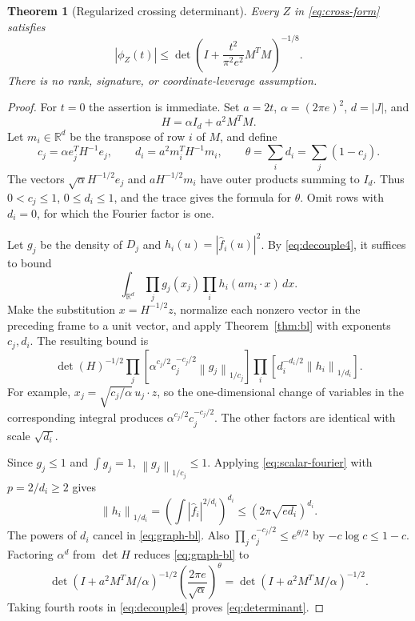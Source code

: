 \documentclass[11pt]{article}
\numberwithin{equation}{section}
\newtheorem{theorem}{Theorem}[section]
\theoremstyle{definition}\newtheorem{definition}[theorem]{Definition}
\theoremstyle{remark}\newtheorem{remark}[theorem]{Remark}
\newcommand{\R}{\mathbb R}\newcommand{\E}{\mathbb E}\newcommand{\PP}{\mathbb P}
\newcommand{\1}{\mathbf 1}\newcommand{\diag}{\operatorname{diag}}
\newcommand{\norm}[1]{\left\lVert#1\right\rVert}\newcommand{\abs}[1]{\left|#1\right|}
\begin{document}
\begin{theorem}[Regularized crossing determinant]\label{thm:determinant}
Every $Z$ in \eqref{eq:cross-form} satisfies
\begin{equation}\label{eq:determinant}
 |\phi_Z(t)|\le\det\left(I+\frac{t^2}{\pi^2e^2}M^TM\right)^{-1/8}.
\end{equation}
There is no rank, signature, or coordinate-leverage assumption.
\end{theorem}
\begin{proof}
For $t=0$ the assertion is immediate. Set $a=2t$, $\alpha=(2\pi e)^2$, $d=|J|$, and
\[
 H=\alpha I_d+a^2M^TM.
\]
Let $m_i\in\R^d$ be the transpose of row $i$ of $M$, and define
\[
 c_j=\alpha e_j^TH^{-1}e_j,\qquad
 d_i=a^2m_i^TH^{-1}m_i,\qquad
 \theta=\sum_i d_i=\sum_j(1-c_j).
\]
The vectors $\sqrt\alpha H^{-1/2}e_j$ and $aH^{-1/2}m_i$ have outer products summing to $I_d$. Thus $0<c_j\le1$, $0\le d_i\le1$, and the trace gives the formula for $\theta$. Omit rows with $d_i=0$, for which the Fourier factor is one.

Let $g_j$ be the density of $D_j$ and $h_i(u)=|\widehat f_i(u)|^2$. By \eqref{eq:decouple4}, it suffices to bound
\[
 \int_{\R^d}\prod_j g_j(x_j)\prod_i h_i(a m_i\cdot x)\,dx.
\]
Make the substitution $x=H^{-1/2}z$, normalize each nonzero vector in the preceding frame to a unit vector, and apply Theorem~\ref{thm:bl} with exponents $c_j,d_i$. The resulting bound is
\begin{equation}\label{eq:graph-bl}
 \det(H)^{-1/2}
 \prod_j\left[\alpha^{c_j/2}c_j^{-c_j/2}\norm{g_j}_{1/c_j}\right]
 \prod_i\left[d_i^{-d_i/2}\norm{h_i}_{1/d_i}\right].
\end{equation}
For example, $x_j=\sqrt{c_j/\alpha}\,u_j\cdot z$, so the one-dimensional change of variables in the corresponding integral produces $\alpha^{c_j/2}c_j^{-c_j/2}$. The other factors are identical with scale $\sqrt{d_i}$.

Since $g_j\le1$ and $\int g_j=1$, $\norm{g_j}_{1/c_j}\le1$. Applying \eqref{eq:scalar-fourier} with $p=2/d_i\ge2$ gives
\[
 \norm{h_i}_{1/d_i}
 =\left(\int|\widehat f_i|^{2/d_i}\right)^{d_i}
 \le(2\pi\sqrt{e d_i})^{d_i}.
\]
The powers of $d_i$ cancel in \eqref{eq:graph-bl}. Also
$\prod_j c_j^{-c_j/2}\le e^{\theta/2}$ by $-c\log c\le1-c$.
Factoring $\alpha^d$ from $\det H$ reduces \eqref{eq:graph-bl} to
\[
 \det(I+a^2M^TM/\alpha)^{-1/2}
 \left(\frac{2\pi e}{\sqrt\alpha}\right)^\theta
 =\det(I+a^2M^TM/\alpha)^{-1/2}.
\]
Taking fourth roots in \eqref{eq:decouple4} proves \eqref{eq:determinant}.
\end{proof}
\end{document}
